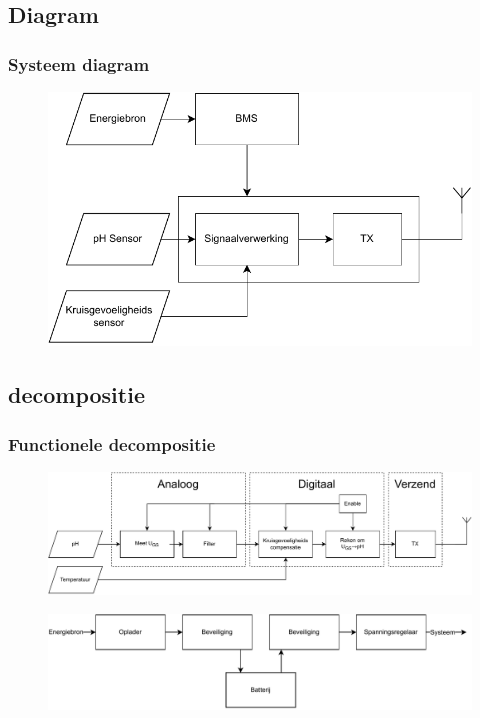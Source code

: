     \subsection*{Diagram}
    \begin{frame}
        \frametitle{Systeem diagram}
        
        \begin{figure}
            \centering
            \includegraphics[width=\textwidth]{img/system.pdf}
        \end{figure}
            
    \end{frame}
        
    
    \subsection*{decompositie}
    \begin{frame}
        \frametitle{Functionele decompositie}
        \begin{figure}
            \centering
            \includegraphics[width=\textwidth]{img/meetGedeelte.pdf}
        \end{figure}
        \begin{figure}
            \centering
            \includegraphics[width=\textwidth]{img/funcdDecompEnergy.pdf}
        \end{figure}    
    \end{frame}
